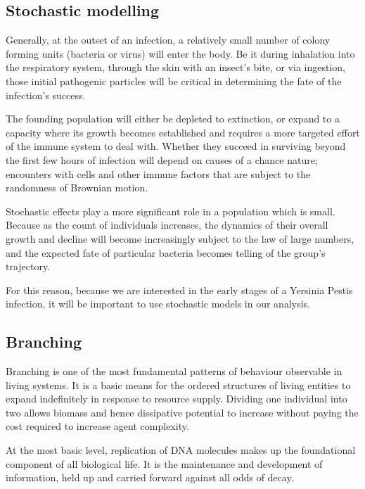 \subsection{Stochastic modelling}

Generally, at the outset of an infection, a relatively small number of colony forming units (bacteria or virus) will enter the body. 
Be it during inhalation into the respiratory system, through the skin with an insect's bite, or via ingestion, those initial pathogenic particles will be critical in determining the fate of the infection's success. 

The founding population will either be depleted to extinction, or expand to a capacity where its growth becomes established and requires a more targeted effort of the immune system to deal with. Whether they succeed in surviving beyond the first few hours of infection will depend on causes of a chance nature; encounters with cells and other immune factors that are subject to the randomness of Brownian motion.  


Stochastic effects play a more significant role in a population which is small. Because as the count of individuals increases, the dynamics of their overall growth and decline will become increasingly subject to the law of large numbers, and the expected fate of particular bacteria becomes telling of the group's trajectory. 

For this reason, because we are interested in the early stages of a Yersinia Pestis infection, it will be important to use stochastic models in our analysis.


\subsection{Branching}

Branching is one of the most fundamental patterns of behaviour observable in living systems. It is a basic means for the ordered structures of living entities to expand indefinitely in response to resource supply. Dividing one individual into two allows biomass and hence dissipative potential to increase without paying the cost required to increase agent complexity.\par

At the most basic level, replication of DNA molecules makes up the foundational component of all biological life. It is the maintenance and development of information, held up and carried forward against all odds of decay.\par

